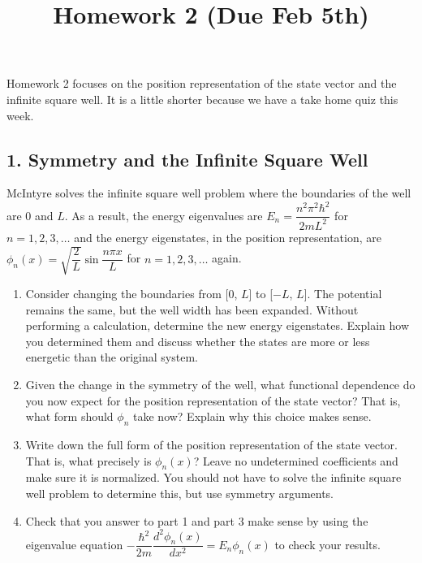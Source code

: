 \documentclass[
]{article}
\title{Homework 2 (Due Feb 5th)}
\author{}
\date{}
\providecommand{\tightlist}{%
  \setlength{\itemsep}{0pt}\setlength{\parskip}{0pt}}
\providecommand{\tightlist}{%
  \setlength{\itemsep}{0pt}\setlength{\parskip}{0pt}}
\begin{document}
\maketitle

Homework 2 focuses on the position representation of the state vector
and the infinite square well. It is a little shorter because we have a
take home quiz this week.

\hypertarget{symmetry-and-the-infinite-square-well}{%
\subsection{1. Symmetry and the Infinite Square
Well}\label{symmetry-and-the-infinite-square-well}}

McIntyre solves the infinite square well problem where the boundaries of
the well are 0 and \(L\). As a result, the energy eigenvalues are
\(E_n = \dfrac{n^2\pi^2\hbar^2}{2mL^2}\) for \(n = 1,2,3,\dots\) and the
energy eigenstates, in the position representation, are
\(\phi_n(x) = \sqrt{\dfrac{2}{L}} \sin \dfrac{n\pi x}{L}\) for
\(n = 1,2,3,\dots\) again.

\begin{enumerate}
\def\labelenumi{\arabic{enumi}.}
\tightlist
\item
  Consider changing the boundaries from {[}0, \(L\){]} to {[}\(-L\),
  \(L\){]}. The potential remains the same, but the well width has been
  expanded. Without performing a calculation, determine the new energy
  eigenstates. Explain how you determined them and discuss whether the
  states are more or less energetic than the original system.
\item
  Given the change in the symmetry of the well, what functional
  dependence do you now expect for the position representation of the
  state vector? That is, what form should \(\phi_n\) take now? Explain
  why this choice makes sense.
\item
  Write down the full form of the position representation of the state
  vector. That is, what precisely is \(\phi_n(x)\)? Leave no
  undetermined coefficients and make sure it is normalized. You should
  not have to solve the infinite square well problem to determine this,
  but use symmetry arguments.
\item
  Check that you answer to part 1 and part 3 make sense by using the
  eigenvalue equation
  \(-\dfrac{\hbar^2}{2m} \dfrac{d^2\phi_n(x)}{dx^2} = E_n \phi_n(x)\) to
  check your results.
\end{enumerate}
\end{document}
